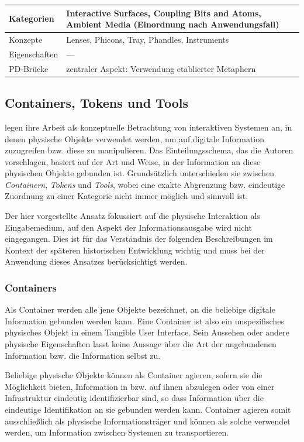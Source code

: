 \begin{tabular}{| p{3cm} | p{10cm} |}
  \hline
  Kategorien & Interactive Surfaces, Coupling Bits and Atoms, Ambient Media (Einordnung nach Anwendungsfall) \\ \hline
  Konzepte & Lenses, Phicons, Tray, Phandles, Instruments \\ \hline
  Eigenschaften & --- \\ \hline
  PD-Brücke & zentraler Aspekt: Verwendung etablierter Metaphern \\ \hline
\end{tabular} 

\subsection{Containers, Tokens und Tools}
\label{sub:containers_tokens_tools}

\citet{Holmquist99} legen ihre Arbeit als konzeptuelle Betrachtung von interaktiven Systemen an, in denen physische Objekte verwendet werden, um auf digitale Information zuzugreifen bzw. diese zu manipulieren. Das Einteilungsschema, das die Autoren vorschlagen, basiert auf der Art und Weise, in der Information an diese physischen Objekte gebunden ist. Grundsätzlich unterschieden sie zwischen \emph{Containern}, \emph{Tokens} und \emph{Tools}, wobei eine exakte Abgrenzung bzw. eindeutige Zuordnung zu einer Kategorie nicht immer möglich und sinnvoll ist.

Der hier vorgestellte Ansatz fokussiert auf die physische Interaktion als Eingabemedium, auf den Aspekt der Informationsausgabe wird nicht eingegangen. Dies ist für das Verständnis der folgenden Beschreibungen im Kontext der späteren historischen Entwicklung wichtig und muss bei der Anwendung dieses Ansatzes berücksichtigt werden. 

\subsubsection{Containers}

Als Container werden alle jene Objekte bezeichnet, an die beliebige digitale Information gebunden werden kann. Eine Container ist also ein unspezifisches physisches Objekt in einem Tangible User Interface. Sein Aussehen oder andere physische Eigenschaften lasst keine Aussage über die Art der angebundenen Information bzw. die Information selbst zu. 

Beliebige physische Objekte können als Container agieren, sofern sie die Möglichkeit bieten, Information in bzw. auf ihnen abzulegen oder von einer Infrastruktur eindeutig identifizierbar sind, so dass Information über die eindeutige Identifikation an sie gebunden werden kann. Container agieren somit ausschließlich als physische Informationsträger und können als solche verwendet werden, um Information zwischen Systemen zu transportieren. 

